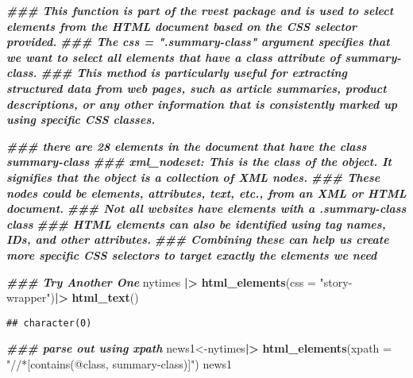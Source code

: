 \documentclass[
]{article}
\newenvironment{Shaded}{\begin{snugshade}}{\end{snugshade}}
\newcommand{\AttributeTok}[1]{\textcolor[rgb]{0.13,0.29,0.53}{#1}}
\newcommand{\DocumentationTok}[1]{\textcolor[rgb]{0.56,0.35,0.01}{\textbf{\textit{#1}}}}
\newcommand{\FunctionTok}[1]{\textcolor[rgb]{0.13,0.29,0.53}{\textbf{#1}}}
\newcommand{\NormalTok}[1]{#1}
\newcommand{\OtherTok}[1]{\textcolor[rgb]{0.56,0.35,0.01}{#1}}
\newcommand{\SpecialCharTok}[1]{\textcolor[rgb]{0.81,0.36,0.00}{\textbf{#1}}}
\newcommand{\StringTok}[1]{\textcolor[rgb]{0.31,0.60,0.02}{#1}}
\begin{document}
\begin{Shaded}
\begin{Highlighting}[]
\DocumentationTok{\#\#\# This function is part of the rvest package and is used to select elements from the HTML document based on the CSS selector provided. }
\DocumentationTok{\#\#\# The css = ".summary{-}class" argument specifies that we want to select all elements that have a class attribute of summary{-}class.}
\DocumentationTok{\#\#\# This method is particularly useful for extracting structured data from web pages, such as article summaries, product descriptions, or any other information that is consistently marked up using specific CSS classes.}


\DocumentationTok{\#\#\# there are 28 elements in the document that have the class summary{-}class}
\DocumentationTok{\#\#\# xml\_nodeset: This is the class of the object. It signifies that the object is a collection of XML nodes. }
\DocumentationTok{\#\#\# These nodes could be elements, attributes, text, etc., from an XML or HTML document.}
\DocumentationTok{\#\#\# Not all websites have elements with a .summary{-}class class}
\DocumentationTok{\#\#\# HTML elements can also be identified using tag names, IDs, and other attributes. }
\DocumentationTok{\#\#\# Combining these can help us create more specific CSS selectors to target exactly the elements we need}

\DocumentationTok{\#\#\# Try Another One}
\NormalTok{nytimes }\SpecialCharTok{|\textgreater{}}
  \FunctionTok{html\_elements}\NormalTok{(}\AttributeTok{css =} \StringTok{"story{-}wrapper"}\NormalTok{)}\SpecialCharTok{|\textgreater{}}
  \FunctionTok{html\_text}\NormalTok{()}
\end{Highlighting}
\end{Shaded}

\begin{verbatim}
## character(0)
\end{verbatim}

\begin{Shaded}
\begin{Highlighting}[]
\DocumentationTok{\#\#\# parse out using xpath}
\NormalTok{news1}\OtherTok{\textless{}{-}}\NormalTok{nytimes}\SpecialCharTok{|\textgreater{}}
  \FunctionTok{html\_elements}\NormalTok{(}\AttributeTok{xpath =} \StringTok{"//*[contains(@class, \textquotesingle{}summary{-}class\textquotesingle{})]"}\NormalTok{) }
\NormalTok{news1}
\end{Highlighting}
\end{Shaded}
\end{document}
